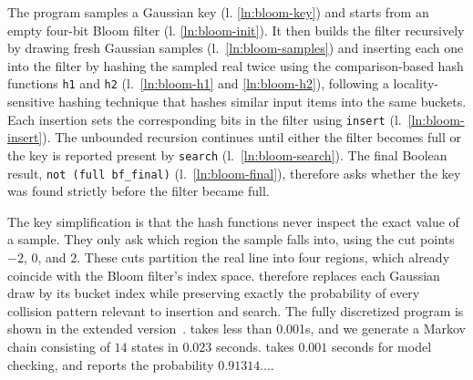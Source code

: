 %
The program samples a Gaussian key (l. \ref{ln:bloom-key}) and starts from an empty four-bit Bloom filter (l. \ref{ln:bloom-init}). It then builds the filter recursively by drawing fresh Gaussian samples (l.\ \ref{ln:bloom-samples}) and inserting each one into the filter by hashing the sampled real twice using the comparison-based hash functions \lstinline{h1} and \lstinline{h2} (l.\ \ref{ln:bloom-h1} and \ref{ln:bloom-h2}), following a locality-sensitive hashing technique that hashes similar input items into the same buckets. Each insertion sets the corresponding bits in the filter using \lstinline{insert} (l.\ \ref{ln:bloom-insert}). The unbounded recursion continues until either the filter becomes full or the key is reported present by \lstinline{search} (l.\ \ref{ln:bloom-search}). The final Boolean result, \lstinline{not (full bf_final)} (l.\ \ref{ln:bloom-final}), therefore asks whether the key was found strictly before the filter became full.

The key simplification is that the hash functions never inspect the exact value of a sample. They only ask which region the sample falls into, using the cut points $-2$, $0$, and $2$. These cuts partition the real line into four regions, which already coincide with the Bloom filter's index space. \Slice{} therefore replaces each Gaussian draw by its bucket index while preserving exactly the probability of every collision pattern relevant to insertion and search. The fully discretized program is shown in the extended version~\cite[Figure~24]{Wu2026SliceExtended}. \Slice{} takes less than 0.001s, and we generate a Markov chain consisting of $14$ states in $0.023$ seconds. \Storm takes $0.001$ seconds for model checking, and reports the probability $0.91314...$.

%
%

